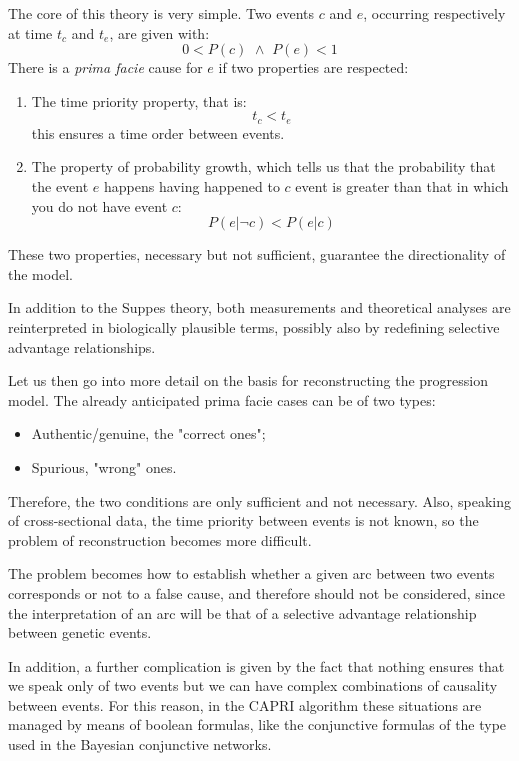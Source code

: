 The core of this theory is very simple. Two events $c$ and $e$, occurring respectively at time $t_c$
and $t_e$, are given with:
\begin{equation*}
    0 < P(c) \,\, \land \,\, P(e) < 1
\end{equation*}
There is a \textit{prima facie} cause for $e$ if two properties are respected:
\begin{enumerate}
    \item The time priority property, that is:
          \begin{equation*}
              t_c < t_e
          \end{equation*}
          this ensures a time order between events.
    \item The property of probability growth, which tells us that the probability that the event $e$
          happens having happened to $c$ event is greater than that in which you do not have event $c$:
          \begin{equation*}
              P(e| \lnot c) < P(e|c)
          \end{equation*}
\end{enumerate}
These two properties, necessary but not sufficient, guarantee the directionality of the model.

In addition to the Suppes theory, both measurements and theoretical analyses are reinterpreted in
biologically plausible terms, possibly also by redefining selective advantage relationships.

Let us then go into more detail on the basis for reconstructing the progression model. The already
anticipated prima facie cases can be of two types:
\begin{itemize}
    \item Authentic/genuine, the "correct ones";
    \item Spurious, "wrong" ones.
\end{itemize}
Therefore, the two conditions are only sufficient and not necessary. Also, speaking of cross-sectional
data, the time priority between events is not known, so the problem of reconstruction becomes more
difficult.

The problem becomes how to establish whether a given arc between two events corresponds or not to a
false cause, and therefore should not be considered, since the interpretation of an arc will be that of
a selective advantage relationship between genetic events.

In addition, a further complication is given by the fact that nothing ensures that we speak only of two
events but we can have complex combinations of causality between events. For this reason, in the CAPRI
algorithm these situations are managed by means of boolean formulas, like the conjunctive formulas of
the type used in the Bayesian conjunctive networks.

